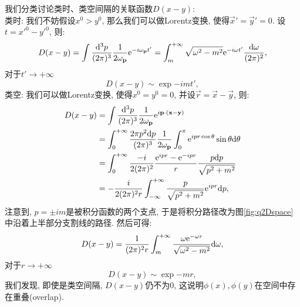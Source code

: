 
我们分类讨论类时、类空间隔的关联函数$D(x-y)$:\\
类时: 我们不妨假设$x^0>y^0$, 那么我们可以做Lorentz变换, 使得$\vec x'=\vec y'=0$. 设$t={x'}^0-{y'}^0$, 则:
\begin{equation}
    D(x-y)=\int\ld p\exp{-i\omega_{\vec p}t'}=\int_m^{+\infty}\sqrt{\omega^2-m^2}\exp{-i\omega t'}\frac{\d\omega}{\dpi2},
\end{equation}
对于$t'\rightarrow+\infty$
\begin{equation}
    D(x-y)\sim\exp{-imt'},
\end{equation}
类空: 我们可以做Lorentz变换, 使得$x^0=y^0=0$, 并设$\vec r=\vec x-\vec y$, 则:
\begin{align}
    D(x-y)&=\int\ld p\exp{i\vec p\cdot(\vec x-\vec y)}\\
    &=\int_0^{+\infty}\frac{2\pi p^2\d p}{\dpi3}\frac1{2\omega_{\vec p}}\int_0^\pi\exp{ipr\cos\theta}\sin\theta\d\theta\\
    &=\int_0^{+\infty}\frac{-i}{2\dpi2}\frac{\exp{ipr}-\exp{-ipr}}r\frac{p\d p}{\sqrt{p^2+m^2}}\\
    &=-\frac i{2\dpi2r}\int_{-\infty}^{+\infty}\frac{p}{\sqrt{p^2+m^2}}\exp{ipr}\d p,
\end{align}
注意到, $p=\pm im$是被积分函数的两个支点, 于是将积分路径改为图\ref{fig:q2Dspace}中沿着上半部分支割线的路径. 然后可得:
\begin{equation}
    D(x-y)=\frac1{(2\pi)^{2} r}\int_m^{+\infty}\frac{\omega\mathrm e^{-\omega r}}{\sqrt{\omega^2-m^2}}\mathrm d\omega,
\end{equation}
对于$r\rightarrow+\infty$
\begin{equation}
    D(x-y)\sim\exp{-mr},
\end{equation}
我们发现, 即使是类空间隔, $D(x-y)$仍不为0, 这说明$\phi(x), \phi(y)$在空间中存在重叠(overlap). 
